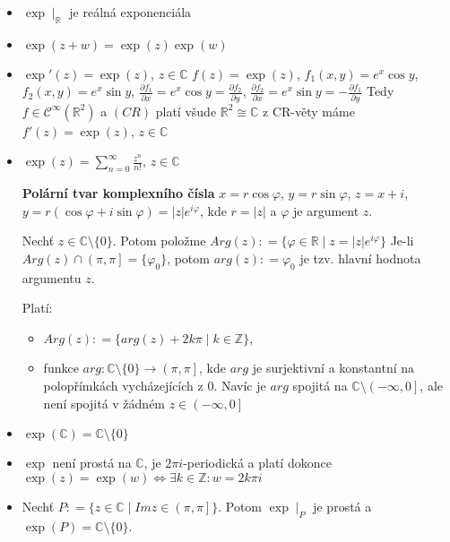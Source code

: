 \begin{properties}
\begin{itemize}
    \item $\exp \mid_{  \mathbb{R}}$ je reálná exponenciála 
    \item $\exp(z+w)=\exp(z)\exp(w)$
    \item $\exp'(z)=\exp(z)$, $ z \in\mathbb{C}$
     \newline
     $f(z)=\exp(z)$, $f_1(x,y)=e^x \cos y$, $ f_2(x,y)=e^x\sin y$, 
     \newline
     $\frac{\partial f_1}{\partial x} = e^x\cos y = \frac{\partial f_2}{\partial y}$, $
     \frac{\partial f_2}{\partial x} = e^x \sin y= - \frac{\partial f_1}{\partial y}$
     \newline Tedy $f\in\mathcal{C}^{\infty}(\mathbb{R}^2)$ a $(CR)$ platí všude $\mathbb{R}^2\cong\mathbb{C}$ z CR-věty máme $f'(z)=\exp(z)$, $z\in\mathbb{C}$
     \item $\exp(z)=\sum_{n=0}^{\infty}\frac{z^n}{n!}$, $z\in\mathbb{C}$
     \newline
     
     \textbf{Polární tvar komplexního čísla}
       $ x=r\cos \varphi$, $
        y=r\sin \varphi$, $
        z=x+i$, $ y=r(\cos \varphi + i \sin \varphi)=\lvert z \rvert e^{i\varphi} $, kde $r=\lvert z \rvert$ a $\varphi$ je argument $z$.
    
     
     \begin{notation}
          Nechť $z\in\mathbb{C}\setminus\{0\}$. Potom položme $Arg(z)\colon=\{\varphi\in\mathbb{R}\mid z=\lvert z \rvert e^{i\varphi}\}$ Je-li $Arg(z) \cap \left (\pi,\pi\right ]=\{\varphi_0\}$, potom $arg(z)\colon=\varphi_0$ je tzv. hlavní hodnota argumentu $z$. 
     \end{notation}
     
         Platí: 
        \begin{itemize}
            \item $Arg(z)\colon = \{arg(z)+2k\pi\mid k\in\mathbb{Z}\}$,
            \item funkce $arg\colon \mathbb {C}\setminus\{0\} \to \left (\pi,\pi\right ]$, kde $arg$ je surjektivní a  konstantní na polopřímkách vycházejících z $0$. Navíc je $arg$ spojitá na $\mathbb {C}\setminus\left (-\infty,0\right ]$, ale není spojitá v žádném $z\in \left (-\infty,0\right ]$
        \end{itemize}

     \item $\exp(\mathbb{C})=\mathbb{C}\setminus\{0\}$ 
     \item $\exp$ není prostá na $\mathbb{C}$, je $2\pi i$-periodická a platí dokonce\colon
     \newline
    $\exp(z) =\exp(w) \iff\exists k \in\mathbb{Z}\colon w=2k\pi i$
     \item Nechť $P\colon=\{z\in\mathbb{C}\mid Im z \in \left (\pi,\pi\right ]\}$.
     Potom $\exp{}\mid_P$ je prostá a $\exp(P)=\mathbb{C}\setminus\{0\}$.
\end{itemize}
\end{properties}

